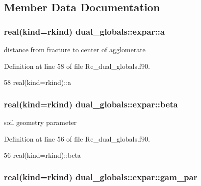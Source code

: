 \subsection{Member Data Documentation}
\subsubsection[{a}]{\setlength{\rightskip}{0pt plus 5cm}real(kind=rkind) dual\+\_\+globals\+::expar\+::a}\label{structdual__globals_1_1expar_abd4a18a97a45b2e57ca327a4185c5e0f}


distance from fracture to center of agglomerate 



Definition at line 58 of file Re\+\_\+dual\+\_\+globals.\+f90.


\begin{DoxyCode}
58   \textcolor{keywordtype}{real(kind=rkind)}::a
\end{DoxyCode}
\subsubsection[{beta}]{\setlength{\rightskip}{0pt plus 5cm}real(kind=rkind) dual\+\_\+globals\+::expar\+::beta}\label{structdual__globals_1_1expar_af526ab122758ad36386312acf6d69510}


soil geometry parameter 



Definition at line 56 of file Re\+\_\+dual\+\_\+globals.\+f90.


\begin{DoxyCode}
56   \textcolor{keywordtype}{real(kind=rkind)}::beta
\end{DoxyCode}
\subsubsection[{gam\+\_\+par}]{\setlength{\rightskip}{0pt plus 5cm}real(kind=rkind) dual\+\_\+globals\+::expar\+::gam\+\_\+par}\label{structdual__globals_1_1expar_a6c13d1e81440f899dcd5ddae1f160e9a}


